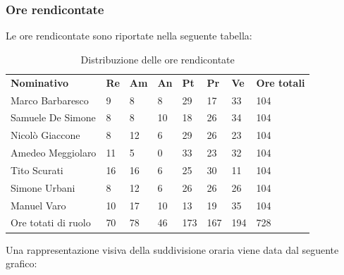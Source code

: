     \subsubsection{Ore rendicontate}
        Le ore rendicontate sono riportate nella seguente tabella:
            \begin{center}
                \begin{table}[ht!]
                    \centering
                    \caption{Distribuzione delle ore rendicontate}
                \vspace{5px}
                    \renewcommand{\arraystretch}{1.8}
                    \begin{tabular}{p{100px} p{20px} p{20px} p{20px} p{20px} p{20px} p{20px} p{50px} }
                        \rowcolor{logo!70} \textbf{Nominativo} & \textbf{Re} & \textbf{Am} & \textbf{An} & \textbf{Pt} & \textbf{Pr} & \textbf{Ve} & \textbf{Ore totali}\\
                        Marco Barbaresco & 9 & 8 & 8 & 29 & 17 & 33 & 104\\
                        Samuele De Simone & 8 & 8 & 10 & 18 & 26 & 34 & 104\\
                        Nicolò Giaccone & 8 & 12 & 6 & 29 & 26 & 23 & 104\\
                        Amedeo Meggiolaro & 11 & 5 & 0 & 33 & 23 & 32 & 104\\
                        Tito Scurati & 16 & 16 & 6 & 25 & 30 & 11 & 104\\
                        Simone Urbani & 8 & 12 & 6 & 26 & 26 & 26 & 104\\
                        Manuel Varo & 10 & 17 & 10 & 13 & 19 & 35 & 104\\
                        Ore totati di ruolo & 70 & 78 & 46 & 173 & 167 & 194 & 728\\
                    \end{tabular}
                \end{table}
            \end{center}
            \pagebreak
            Una rappresentazione visiva della suddivisione oraria viene data dal seguente grafico:
